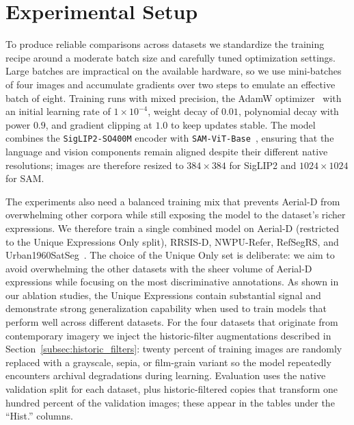 \section{Experimental Setup}

To produce reliable comparisons across datasets we standardize the training recipe around a moderate batch size and carefully tuned optimization settings. Large batches are impractical on the available hardware, so we use mini-batches of four images and accumulate gradients over two steps to emulate an effective batch of eight. Training runs with mixed precision, the AdamW optimizer~\cite{adamw} with an initial learning rate of $1\times 10^{-4}$, weight decay of $0.01$, polynomial decay with power $0.9$, and gradient clipping at $1.0$ to keep updates stable. The model combines the \texttt{SigLIP2-SO400M} encoder with \texttt{SAM-ViT-Base}~\cite{siglip2,sam}, ensuring that the language and vision components remain aligned despite their different native resolutions; images are therefore resized to $384\times384$ for SigLIP2 and $1024\times1024$ for SAM.

The experiments also need a balanced training mix that prevents Aerial-D from overwhelming other corpora while still exposing the model to the dataset's richer expressions. We therefore train a single combined model on Aerial-D (restricted to the Unique Expressions Only split), RRSIS-D, NWPU-Refer, RefSegRS, and Urban1960SatSeg~\cite{yuan2023rrsis,yang2024large,hao2025urban1960satseg}. The choice of the Unique Only set is deliberate: we aim to avoid overwhelming the other datasets with the sheer volume of Aerial-D expressions while focusing on the most discriminative annotations. As shown in our ablation studies, the Unique Expressions contain substantial signal and demonstrate strong generalization capability when used to train models that perform well across different datasets. For the four datasets that originate from contemporary imagery we inject the historic-filter augmentations described in Section~\ref{subsec:historic_filters}: twenty percent of training images are randomly replaced with a grayscale, sepia, or film-grain variant so the model repeatedly encounters archival degradations during learning. Evaluation uses the native validation split for each dataset, plus historic-filtered copies that transform one hundred percent of the validation images; these appear in the tables under the ``Hist.'' columns.

